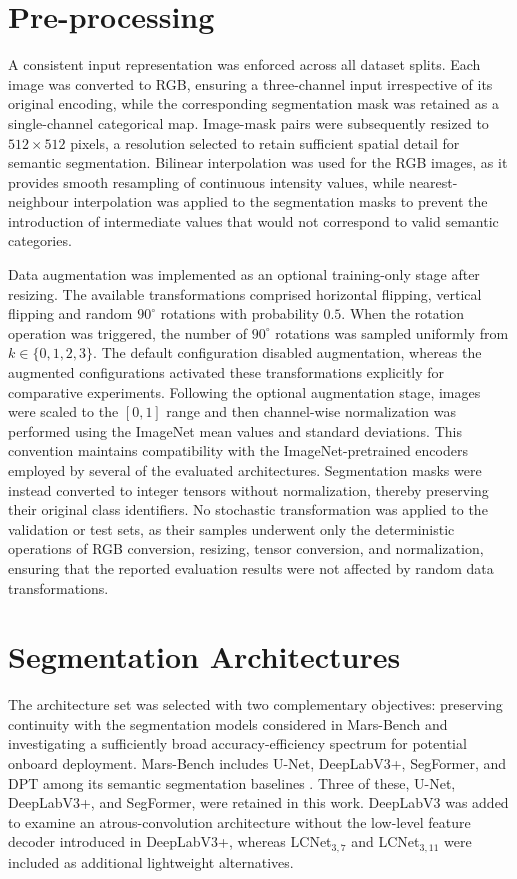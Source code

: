 \section{Pre-processing}

A consistent input representation was enforced across all dataset splits. Each image was converted to RGB, ensuring a three-channel input irrespective of its original encoding, while the corresponding segmentation mask was retained as a single-channel categorical map. Image-mask pairs were subsequently resized to \(512 \times 512\) pixels, a resolution selected to retain sufficient spatial detail for semantic segmentation. Bilinear interpolation was used for the RGB images, as it provides smooth resampling of continuous intensity values, while nearest-neighbour interpolation was applied to the segmentation masks to prevent the introduction of intermediate values that would not correspond to valid semantic categories.

Data augmentation was implemented as an optional training-only stage after resizing. The available transformations comprised horizontal flipping, vertical flipping and random \(90^{\circ}\) rotations with probability \(0.5\). When the rotation operation was triggered, the number of \(90^{\circ}\) rotations was sampled uniformly from \(k \in \{0,1,2,3\}\). The default configuration disabled augmentation, whereas the augmented configurations activated these transformations explicitly for comparative experiments. Following the optional augmentation stage, images were scaled to the \([0,1]\) range and then channel-wise normalization was performed using the ImageNet mean values and standard deviations. This convention maintains compatibility with the ImageNet-pretrained encoders employed by several of the evaluated architectures. Segmentation masks were instead converted to integer tensors without normalization, thereby preserving their original class identifiers.
No stochastic transformation was applied to the validation or test sets, as their samples underwent only the deterministic operations of RGB conversion, resizing, tensor conversion, and normalization, ensuring that the reported evaluation results were not affected by random data transformations.

\section{Segmentation Architectures}
\label{sec:segmentation-architectures}

The architecture set was selected with two complementary objectives: preserving continuity with the segmentation models considered in Mars-Bench and investigating a sufficiently broad accuracy-efficiency spectrum for potential onboard deployment. Mars-Bench includes U-Net, DeepLabV3+, SegFormer, and DPT among its semantic segmentation baselines \cite{purohit2025marsbench}. Three of these, U-Net, DeepLabV3+, and SegFormer, were retained in this work. DeepLabV3 was added to examine an atrous-convolution architecture without the low-level feature decoder introduced in DeepLabV3+, whereas LCNet\(_{3,7}\) and LCNet\(_{3,11}\) were included as additional lightweight alternatives.

